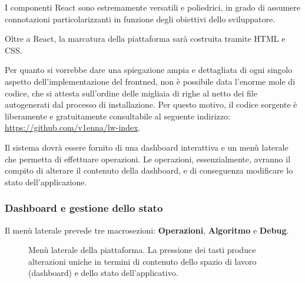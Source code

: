 I componenti React sono estremamente versatili e poliedrici, in grado di assumere connotazioni particolarizzanti in funzione degli obiettivi dello sviluppatore. 

Oltre a React, la marcatura della piattaforma sarà costruita tramite HTML e CSS. 

Per quanto si vorrebbe dare una spiegazione ampia e dettagliata di ogni singolo aspetto dell'implementazione del frontned, non è possibile data l'enorme mole di codice, che si attesta sull'ordine delle migliaia di righe al netto dei file autogenerati dal processo di installazione. Per questo motivo, il codice sorgente è liberamente e gratuitamente consultabile al seguente indirizzo: \url{https://github.com/v1enna/lw-index}.

\vspace{3mm}

Il sistema dovrà essere fornito di una dashboard interattiva e un menù laterale che permetta di effettuare operazioni. Le operazioni, essenzialmente, avranno il compito di alterare il contenuto della dashboard, e di conseguenza modificare lo stato dell'applicazione.
\newpage
\subsubsection{Dashboard e gestione dello stato}

Il menù laterale prevede tre macrosezioni: \textbf{Operazioni}, \textbf{Algoritmo} e \textbf{Debug}.

\begin{figure}[ht!]
    \centering
    \caption{Menù laterale della piattaforma. La pressione dei tasti produce alterazioni uniche in termini di contenuto dello spazio di lavoro (dashboard) e dello stato dell'applicativo.}
    \label{fig:esempio}
\end{figure}

